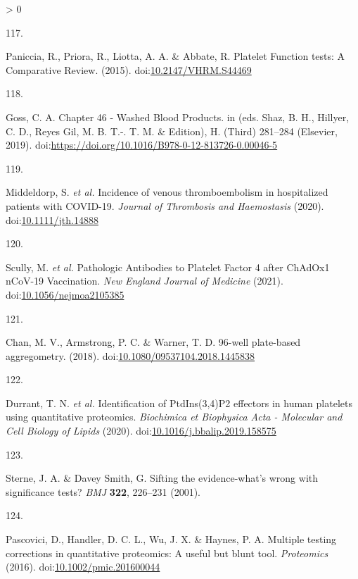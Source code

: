 \documentclass[11pt,twoside]{bristolthesis}
\newlength{\cslhangindent}
\newlength{\csllabelwidth}
\newenvironment{CSLReferences}[2] %
 {%
  \setlength{\parindent}{0pt}
  \ifodd #1 \everypar{\setlength{\hangindent}{\cslhangindent}}\ignorespaces\fi
  \ifnum #2 > 0
  \setlength{\parskip}{#2\baselineskip}
  \fi
 }%
 {}
\newcommand{\CSLLeftMargin}[1]{\parbox[t]{\csllabelwidth}{#1}}
\newcommand{\CSLRightInline}[1]{\parbox[t]{\linewidth - \csllabelwidth}{#1}\break}
\begin{document}
\begin{CSLReferences}{0}{0}
\leavevmode\hypertarget{ref-Paniccia2015}{}%
\CSLLeftMargin{117. }
\CSLRightInline{Paniccia, R., Priora, R., Liotta, A. A. \& Abbate, R. {Platelet Function tests: A Comparative Review}. (2015). doi:\href{https://doi.org/10.2147/VHRM.S44469}{10.2147/VHRM.S44469}}

\leavevmode\hypertarget{ref-Goss2019}{}%
\CSLLeftMargin{118. }
\CSLRightInline{Goss, C. A. {Chapter 46 - Washed Blood Products}. in (eds. Shaz, B. H., Hillyer, C. D., Reyes Gil, M. B. T.-. T. M. \& Edition), H. (Third) 281--284 (Elsevier, 2019). doi:\url{https://doi.org/10.1016/B978-0-12-813726-0.00046-5}}

\leavevmode\hypertarget{ref-Middeldorp2020}{}%
\CSLLeftMargin{119. }
\CSLRightInline{Middeldorp, S. \emph{et al.} {Incidence of venous thromboembolism in hospitalized patients with COVID-19}. \emph{Journal of Thrombosis and Haemostasis} (2020). doi:\href{https://doi.org/10.1111/jth.14888}{10.1111/jth.14888}}

\leavevmode\hypertarget{ref-Scully2021}{}%
\CSLLeftMargin{120. }
\CSLRightInline{Scully, M. \emph{et al.} {Pathologic Antibodies to Platelet Factor 4 after ChAdOx1 nCoV-19 Vaccination}. \emph{New England Journal of Medicine} (2021). doi:\href{https://doi.org/10.1056/nejmoa2105385}{10.1056/nejmoa2105385}}

\leavevmode\hypertarget{ref-Chan2018}{}%
\CSLLeftMargin{121. }
\CSLRightInline{Chan, M. V., Armstrong, P. C. \& Warner, T. D. 96-well plate-based aggregometry. (2018). doi:\href{https://doi.org/10.1080/09537104.2018.1445838}{10.1080/09537104.2018.1445838}}

\leavevmode\hypertarget{ref-Durrant2020}{}%
\CSLLeftMargin{122. }
\CSLRightInline{Durrant, T. N. \emph{et al.} {Identification of PtdIns(3,4)P2 effectors in human platelets using quantitative proteomics}. \emph{Biochimica et Biophysica Acta - Molecular and Cell Biology of Lipids} (2020). doi:\href{https://doi.org/10.1016/j.bbalip.2019.158575}{10.1016/j.bbalip.2019.158575}}

\leavevmode\hypertarget{ref-Sterne2001}{}%
\CSLLeftMargin{123. }
\CSLRightInline{Sterne, J. A. \& Davey Smith, G. {Sifting the evidence-what's wrong with significance tests?} \emph{BMJ} \textbf{322}, 226--231 (2001).}

\leavevmode\hypertarget{ref-Pascovici2016}{}%
\CSLLeftMargin{124. }
\CSLRightInline{Pascovici, D., Handler, D. C. L., Wu, J. X. \& Haynes, P. A. {Multiple testing corrections in quantitative proteomics: A useful but blunt tool}. \emph{Proteomics} (2016). doi:\href{https://doi.org/10.1002/pmic.201600044}{10.1002/pmic.201600044}}


\end{CSLReferences}
\end{document}
